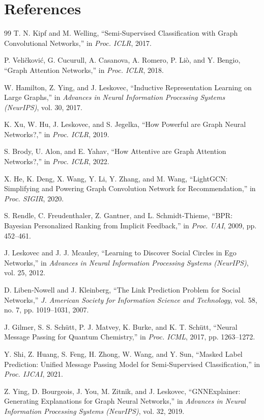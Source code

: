 \documentclass[conference]{IEEEtran}
\begin{document}
\section*{References}
\begin{thebibliography}{99}
T. N. Kipf and M. Welling, ``Semi‑Supervised Classification with Graph Convolutional Networks,'' in \textit{Proc. ICLR}, 2017.

P. Veli\v{c}kovi\'c, G. Cucurull, A. Casanova, A. Romero, P. Li\`o, and Y. Bengio, ``Graph Attention Networks,'' in \textit{Proc. ICLR}, 2018.

W. Hamilton, Z. Ying, and J. Leskovec, ``Inductive Representation Learning on Large Graphs,'' in \textit{Advances in Neural Information Processing Systems (NeurIPS)}, vol. 30, 2017.

K. Xu, W. Hu, J. Leskovec, and S. Jegelka, ``How Powerful are Graph Neural Networks?,'' in \textit{Proc. ICLR}, 2019.

S. Brody, U. Alon, and E. Yahav, ``How Attentive are Graph Attention Networks?,'' in \textit{Proc. ICLR}, 2022.

X. He, K. Deng, X. Wang, Y. Li, Y. Zhang, and M. Wang, ``LightGCN: Simplifying and Powering Graph Convolution Network for Recommendation,'' in \textit{Proc. SIGIR}, 2020.

S. Rendle, C. Freudenthaler, Z. Gantner, and L. Schmidt‑Thieme, ``BPR: Bayesian Personalized Ranking from Implicit Feedback,'' in \textit{Proc. UAI}, 2009, pp. 452--461.

J. Leskovec and J. J. Mcauley, ``Learning to Discover Social Circles in Ego Networks,'' in \textit{Advances in Neural Information Processing Systems (NeurIPS)}, vol. 25, 2012.

D. Liben‑Nowell and J. Kleinberg, ``The Link Prediction Problem for Social Networks,'' \textit{J. American Society for Information Science and Technology}, vol. 58, no. 7, pp. 1019--1031, 2007.

J. Gilmer, S. S. Sch\"{u}tt, P. J. Matvey, K. Burke, and K. T. Sch\"{u}tt, ``Neural Message Passing for Quantum Chemistry,'' in \textit{Proc. ICML}, 2017, pp. 1263--1272.

Y. Shi, Z. Huang, S. Feng, H. Zhong, W. Wang, and Y. Sun, ``Masked Label Prediction: Unified Message Passing Model for Semi‑Supervised Classification,'' in \textit{Proc. IJCAI}, 2021.

Z. Ying, D. Bourgeois, J. You, M. Zitnik, and J. Leskovec, ``GNNExplainer: Generating Explanations for Graph Neural Networks,'' in \textit{Advances in Neural Information Processing Systems (NeurIPS)}, vol. 32, 2019.
\end{thebibliography}
\end{document}
